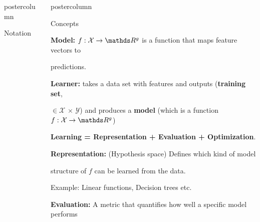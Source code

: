 \documentclass{beamer}
\newlength{\columnheight} %
\begin{document}
\begin{frame}[fragile]{}
\begin{columns}
\begin{column}{.31\textwidth}
\begin{beamercolorbox}[center]{postercolumn}
\begin{minipage}{.98\textwidth}
{\begin{myblock}{Notation}
						
					\end{myblock}\vfill
				}
			\end{minipage}
		\end{beamercolorbox}
	\end{column}
	\begin{column}{.31\textwidth}
		\begin{beamercolorbox}[center]{postercolumn}
			\begin{minipage}{.98\textwidth}
				\parbox[t][\columnheight]{\textwidth}{
					\begin{myblock}{Concepts}
				        
						    \textbf{Model: }$f : \Xspace \rightarrow \R^g$ is a function that maps feature vectors to 
						
						
						    predictions.
						
            \vspace*{0.5ex}
						
						\textbf{Learner: } takes a data set with features and outputs (\textbf{training set},
						
						
						$\in \mathcal{X}\, \times \,\mathcal{Y}$)  and produces a \textbf{model} (which is a function $f : \Xspace \rightarrow \R^g$)
						
						
%						
%						
            \vspace*{0.5ex}
						
						    \textbf{Learning = Representation + Evaluation  + Optimization}.
						
						
						\vspace*{0.5ex}
						
							 \textbf{Representation: }(Hypothesis space) Defines which kind of model
						
						
						 structure of \(f\) can be learned from the data.
						
						\hspace*{1ex}Example: Linear functions, Decision trees etc.
						
						\vspace*{0.5ex}
						
						    \textbf{Evaluation: }A metric that quantifies how well a specific model performs
						

\end{myblock}}
\end{minipage}
\end{beamercolorbox}
\end{column}
\end{columns}
\end{frame}
\end{document}

